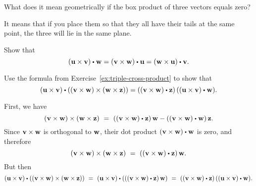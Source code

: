 \begin{enumialphparenastyle}
\begin{ex} \label{exer-box-product-zero}
  What does it mean geometrically if the box product of three vectors
  equals zero?
  \begin{sol}
    It means that if you place them so that they all have their tails
    at the same point, the three will lie in the same plane.
  \end{sol}
\end{ex}

\begin{ex}
  Show that
  \begin{equation*}
    \tup{\vect{u}\times \vect{v}} \dotprod \vect{w}=
    \tup{\vect{v}\times \vect{w}} \dotprod \vect{u}=
    \tup{\vect{w}\times \vect{u}} \dotprod \vect{v}.
  \end{equation*}
\end{ex}

\begin{ex}
  Use the formula from Exercise~\ref{ex:triple-cross-product} to show
  that
  \begin{equation*}
    (\vect{u}\times\vect{v}) \dotprod ((\vect{v}\times\vect{w}) \times
    (\vect{w}\times\vect{z})) =
    ((\vect{v}\times\vect{w})\dotprod\vect{z})\,((\vect{u}\times\vect{v})\dotprod\vect{w}).
  \end{equation*}
  \vspace{-4ex}
  \begin{sol}
    First, we have
    \begin{equation*}
      (\vect{v}\times\vect{w})\times(\vect{w}\times\vect{z})
      ~=~ ((\vect{v}\times\vect{w})\dotprod\vect{z})\,\vect{w}
          - ((\vect{v}\times\vect{w})\dotprod\vect{w})\,\vect{z}.
    \end{equation*}
    Since $\mbox{\bf v}\times\mbox{\bf w}$ is orthogonal to $\mbox{\bf w}$, their
    dot product $(\vect{v}\times\vect{w})\dotprod\vect{w}$ is zero,
    and therefore
    \begin{equation*}
      (\vect{v}\times\vect{w})\times(\vect{w}\times\vect{z})
      ~=~ ((\vect{v}\times\vect{w})\dotprod\vect{z})\,\vect{w}.
    \end{equation*}
    But then
    \begin{equation*}
      (\vect{u}\times\vect{v})\dotprod
      ((\vect{v}\times\vect{w})\times(\vect{w}\times\vect{z}))
      ~=~
      (\vect{u}\times\vect{v})\dotprod(((\vect{v}\times\vect{w})\dotprod\vect{z})\,\vect{w})
      ~=~ ((\vect{v}\times\vect{w})\dotprod\vect{z})\,((\vect{u}\times\vect{v})\dotprod\vect{w}).
    \end{equation*}
    

\end{sol}
\end{ex}
\end{enumialphparenastyle}
